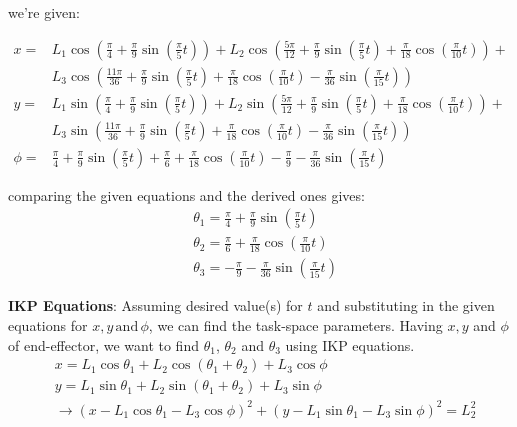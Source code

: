\documentclass[conference]{IEEEtran}
\begin{document}
we're given:
\begin{footnotesize}
    \begin{align*}
        x =    & L_1  \cos\left(\frac{\pi}{4} + \frac{\pi}{9} \sin\left(\frac{\pi}{5} t\right) \right) + L_2 \cos\left(\frac{5\pi}{12} + \frac{\pi}{9} \sin\left(\frac{\pi}{5} t\right) + \frac{\pi}{18} \cos\left(\frac{\pi}{10} t\right)\right) + \\
               & L_3 \cos\left(\frac{11\pi}{36} + \frac{\pi}{9} \sin\left(\frac{\pi}{5} t\right) + \frac{\pi}{18} \cos\left(\frac{\pi}{10} t\right) - \frac{\pi}{36} \sin\left(\frac{\pi}{15} t\right) \right)                                      \\
        y =    & L_1  \sin\left(\frac{\pi}{4} + \frac{\pi}{9} \sin\left(\frac{\pi}{5} t\right) \right) + L_2 \sin\left(\frac{5\pi}{12} + \frac{\pi}{9} \sin\left(\frac{\pi}{5} t\right) + \frac{\pi}{18} \cos\left(\frac{\pi}{10} t\right)\right) + \\
               & L_3 \sin\left(\frac{11\pi}{36} + \frac{\pi}{9} \sin\left(\frac{\pi}{5} t\right) + \frac{\pi}{18} \cos\left(\frac{\pi}{10} t\right) - \frac{\pi}{36} \sin\left(\frac{\pi}{15} t\right) \right)                                      \\
        \phi = & \frac{\pi}{4} + \frac{\pi}{9} \sin\left(\frac{\pi}{5} t\right) + \frac{\pi}{6} + \frac{\pi}{18} \cos\left(\frac{\pi}{10} t\right) - \frac{\pi}{9} - \frac{\pi}{36} \sin\left(\frac{\pi}{15} t\right)
    \end{align*}
\end{footnotesize}

comparing the given equations and the derived ones gives:
\begin{align}
     & \theta_1 = \frac{\pi}{4} + \frac{\pi}{9} \sin\left(\frac{\pi}{5} t\right)     \\
     & \theta_2 = \frac{\pi}{6} + \frac{\pi}{18} \cos\left(\frac{\pi}{10} t\right)   \\
     & \theta_3 = - \frac{\pi}{9} - \frac{\pi}{36} \sin\left(\frac{\pi}{15} t\right)
\end{align}

\textbf{IKP Equations}: Assuming desired value(s) for $t$ and substituting in the given equations for $x, y \,\text{and}\, \phi$, we can find the task-space parameters. Having $x, y$ and $\phi$ of end-effector, we want to find $\theta_1$, $\theta_2$ and $\theta_3$ using IKP equations.
\begin{align*}
     & x            = L_1 \cos \theta_1 + L_2 \cos (\theta_1 + \theta_2) + L_3 \cos \phi                         \\
     & y            = L_1 \sin \theta_1 + L_2 \sin (\theta_1 + \theta_2) + L_3 \sin \phi                         \\
     & \rightarrow (x - L_1 \cos \theta_1 - L_3 \cos \phi)^2 + (y - L_1 \sin \theta_1 - L_3 \sin \phi)^2 = L_2^2
\end{align*}
\end{document}
